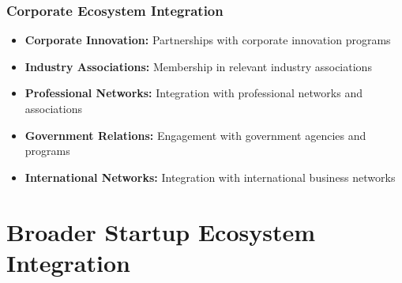 \subsubsection{Corporate Ecosystem Integration}
\begin{itemize}
    \item \textbf{Corporate Innovation:} Partnerships with corporate innovation programs
    \item \textbf{Industry Associations:} Membership in relevant industry associations
    \item \textbf{Professional Networks:} Integration with professional networks and associations
    \item \textbf{Government Relations:} Engagement with government agencies and programs
    \item \textbf{International Networks:} Integration with international business networks
\end{itemize}

\section{Broader Startup Ecosystem Integration}

